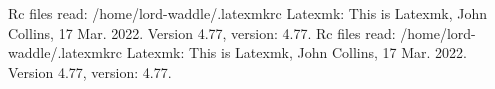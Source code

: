 Rc files read:
  /home/lord-waddle/.latexmkrc
Latexmk: This is Latexmk, John Collins, 17 Mar. 2022. Version 4.77, version: 4.77.
Rc files read:
  /home/lord-waddle/.latexmkrc
Latexmk: This is Latexmk, John Collins, 17 Mar. 2022. Version 4.77, version: 4.77.
